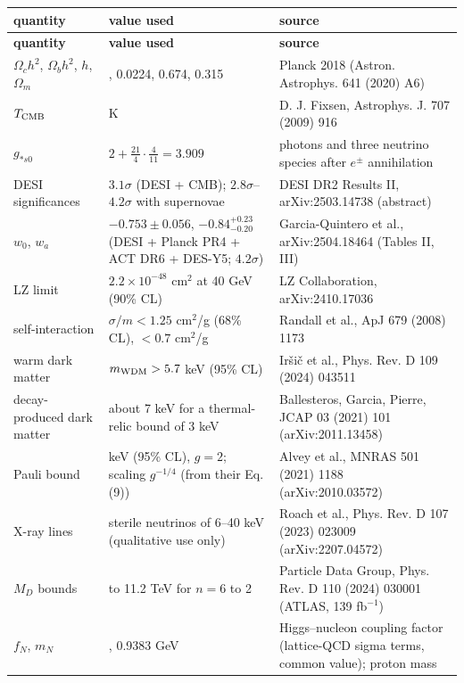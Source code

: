 \documentclass[10pt,a4paper]{article}
\begin{document}
{\footnotesize
\begin{longtable}{>{\raggedright\arraybackslash}p{}>{\raggedright\arraybackslash}p{}>{\raggedright\arraybackslash}p{}}
\toprule
\textbf{quantity} & \textbf{value used} & \textbf{source} \\
\midrule\endfirsthead
\toprule
\textbf{quantity} & \textbf{value used} & \textbf{source} \\
\midrule\endhead
\endfoot
\bottomrule\endlastfoot
$\Omega_ch^2$, $\Omega_bh^2$, $h$, $\Omega_m$ & 0.120, 0.0224, 0.674, 0.315 & Planck 2018 (Astron. Astrophys. 641 (2020) A6) \\
$T_{\rm CMB}$ & 2.7255 K & D. J. Fixsen, Astrophys. J. 707 (2009) 916 \\
$g_{*s0}$ & $2+\frac{21}4\cdot\frac4{11}=3.909$ & photons and three neutrino species after $e^\pm$ annihilation \\
DESI significances & $3.1\sigma$ (DESI + CMB); $2.8\sigma$–$4.2\sigma$ with supernovae & DESI DR2 Results II, arXiv:2503.14738 (abstract) \\
$w_0$, $w_a$ & $-0.753\pm0.056$, $-0.84^{+0.23}_{-0.20}$ (DESI + Planck PR4 + ACT DR6 + DES-Y5; $4.2\sigma$) & Garcia-Quintero et al., arXiv:2504.18464 (Tables II, III) \\
LZ limit & $2.2\times10^{-48}$ cm$^2$ at 40 GeV (90\% CL) & LZ Collaboration, arXiv:2410.17036 \\
self-interaction & $\sigma/m<1.25$ cm$^2$/g (68\% CL), $<0.7$ cm$^2$/g & Randall et al., ApJ 679 (2008) 1173 \\
warm dark matter & $m_{\rm WDM}>5.7$ keV (95\% CL) & Iršič et al., Phys. Rev. D 109 (2024) 043511 \\
decay-produced dark matter & about 7 keV for a thermal-relic bound of 3 keV & Ballesteros, Garcia, Pierre, JCAP 03 (2021) 101 (arXiv:2011.13458) \\
Pauli bound & 0.13 keV (95\% CL), $g=2$; scaling $g^{-1/4}$ (from their Eq. (9)) & Alvey et al., MNRAS 501 (2021) 1188 (arXiv:2010.03572) \\
X-ray lines & sterile neutrinos of 6–40 keV (qualitative use only) & Roach et al., Phys. Rev. D 107 (2023) 023009 (arXiv:2207.04572) \\
$M_D$ bounds & 5.9 to 11.2 TeV for $n=6$ to 2 & Particle Data Group, Phys. Rev. D 110 (2024) 030001 (ATLAS, 139 fb$^{-1}$) \\
$f_N$, $m_N$ & 0.30, 0.9383 GeV & Higgs–nucleon coupling factor (lattice-QCD sigma terms, common value); proton mass \\

\end{longtable}}
\end{document}
